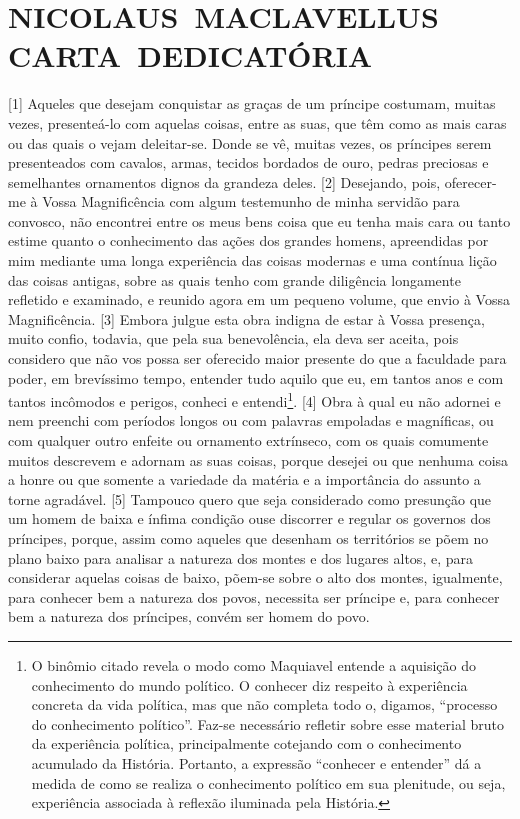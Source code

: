 \section*{NICOLAUS~MACLAVELLUS \break{}CARTA~DEDICATÓRIA}

{[}1{]} Aqueles que desejam conquistar as graças de um príncipe
costumam, muitas vezes, presenteá-lo com aquelas coisas, entre as suas,
que têm como as mais caras ou das quais o vejam deleitar-se. Donde se
vê, muitas vezes, os príncipes serem presenteados com cavalos, armas,
tecidos bordados de ouro, pedras preciosas e semelhantes ornamentos
dignos da grandeza deles. {[}2{]} Desejando, pois, oferecer-me à Vossa
Magnificência com algum testemunho de minha servidão para convosco, não
encontrei entre os meus bens coisa que eu tenha mais cara ou tanto
estime quanto o conhecimento das ações dos grandes homens, apreendidas
por mim mediante uma longa experiência das coisas modernas e uma
contínua lição das coisas antigas, sobre as quais tenho com grande
diligência longamente refletido e examinado, e reunido agora em um
pequeno volume, que envio à Vossa Magnificência. {[}3{]} Embora julgue
esta obra indigna de estar à Vossa presença, muito confio, todavia, que
pela sua benevolência, ela deva ser aceita, pois considero que não vos
possa ser oferecido maior presente do que a faculdade para poder, em
brevíssimo tempo, entender tudo aquilo que eu, em tantos anos e com
tantos incômodos e perigos, conheci e entendi\footnote{O binômio citado
  revela o modo como Maquiavel entende a aquisição do conhecimento do
  mundo político. O conhecer diz respeito à experiência concreta da vida
  política, mas que não completa todo o, digamos, ``processo do
  conhecimento político''. Faz-se necessário refletir sobre esse
  material bruto da experiência política, principalmente cotejando com o
  conhecimento acumulado da História. Portanto, a expressão ``conhecer e
  entender'' dá a medida de como se realiza o conhecimento político em
  sua plenitude, ou seja, experiência associada à reflexão iluminada
  pela História.}. {[}4{]} Obra à qual eu não adornei e nem preenchi com
períodos longos ou com palavras empoladas e magníficas, ou com qualquer
outro enfeite ou ornamento extrínseco, com os quais comumente muitos
descrevem e adornam as suas coisas, porque desejei ou que nenhuma coisa
a honre ou que somente a variedade da matéria e a importância do assunto
a torne agradável. {[}5{]} Tampouco quero que seja considerado como
presunção que um homem de baixa e ínfima condição ouse discorrer e
regular os governos dos príncipes, porque, assim como aqueles que
desenham os territórios se põem no plano baixo para analisar a natureza
dos montes e dos lugares altos, e, para considerar aquelas coisas de
baixo, põem-se sobre o alto dos montes, igualmente, para conhecer bem a
natureza dos povos, necessita ser príncipe e, para conhecer bem a
natureza dos príncipes, convém ser homem do povo.

